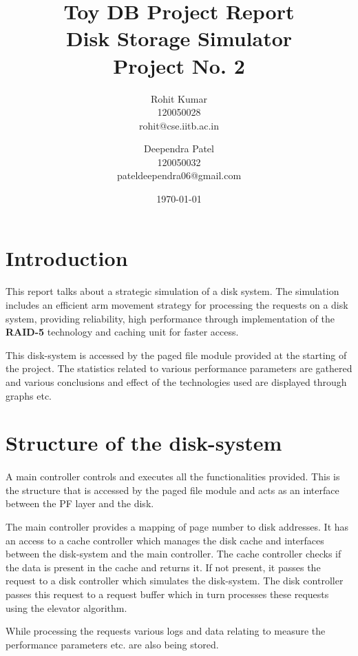 \documentclass[11pt]{article}
\title{\textbf{Toy DB Project Report \\ 
	Disk Storage Simulator \\
	Project No. 2 }}
\author{Rohit Kumar \\ 120050028 \\ rohit@cse.iitb.ac.in
		\and 
		Deependra Patel \\ 120050032 \\ pateldeependra06@gmail.com
		}
\date{\today}
\begin{document}
\maketitle

\section{Introduction}
\paragraph{}

This report talks about a strategic simulation of a disk system. The simulation includes an efficient arm movement strategy for processing the requests on a disk system, providing reliability, high performance through implementation of the \textbf{RAID-5} technology and caching unit for faster access. 

This disk-system is accessed by the paged file module provided at the starting of the project. The statistics related to various performance parameters are gathered and various conclusions and effect of the technologies used are displayed through graphs etc.
	
\section{Structure of the disk-system}
\paragraph{}

A main controller controls and executes all the functionalities provided. This is the structure that is accessed by the paged file module and acts as an interface between the PF layer and the disk.

The main controller provides a mapping of page number to disk addresses. It has an access to a cache controller which manages the disk cache and interfaces between the disk-system and the main controller. The cache controller checks if the data is present in the cache and returns it. If not present, it passes the request to a disk controller which simulates the disk-system. The disk controller passes this request to a request buffer which in turn processes these requests using the elevator algorithm.

While processing the requests various logs and data relating to measure the performance parameters etc. are also being stored.
\end{document}
